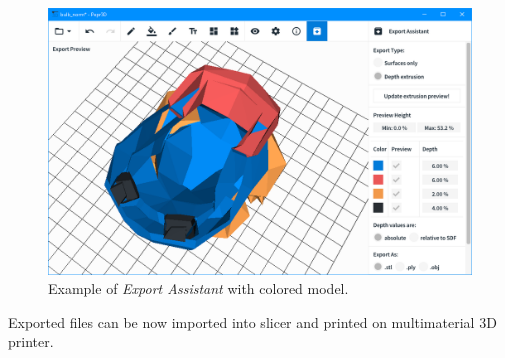 \begin{figure}
	\centering
	\includegraphics[scale=0.5]{images/bulb_export.png}
	\caption{Example of \textit{Export Assistant} with colored model.}
	\label{fig:bulb_export}
\end{figure}


Exported files can be now imported into slicer and printed on multimaterial 3D printer.




